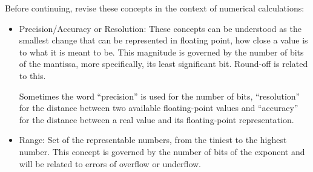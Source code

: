 Before continuing, revise these concepts in the context of numerical calculations:

\begin{itemize}
    \item Precision/Accuracy or Resolution: These concepts can be understood as the smallest change that can be represented in floating point, 
    how close a value is to what it is meant to be. This magnitude is governed by the number of bits of the mantissa, more specifically, its least significant bit. 
    Round-off is related to this. 
    
    Sometimes the word ``precision'' is used for the number of bits, 
    ``resolution'' for the distance between two available floating-point values and 
    ``accuracy'' for the distance between a real value and its floating-point representation. 

    \item Range: Set of the representable numbers, from the tiniest to the highest number. This concept is governed by the number of 
    bits of the exponent and will be related to errors of overflow or underflow. 
\end{itemize}




    

%







    \newpage    
